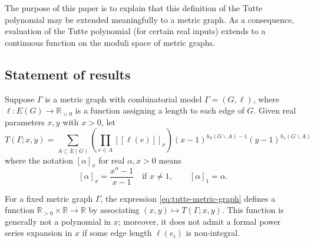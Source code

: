 \documentclass{amsart}
\theoremstyle{definition}
\newcommand{\RR}{\mathbb{R}}
\newcommand{\RRpos}{\RR_{>0}}
\newcommand{\fanalog}[2]{[\![#2]\!]_{#1}}
\newcommand{\analog}[2]{[#2]_{#1}}
\begin{document}
The purpose of this paper is to explain that this definition of the Tutte polynomial may be extended meaningfully to a metric graph.
As a consequence, evaluation of the Tutte polynomial (for certain real inputs) extends to a continuous function on the moduli space of metric graphs.

\subsection{Statement of results}
Suppose $\Gamma$ is a metric graph with combinatorial model $\Gamma = (G,\ell)$,
where $\ell : E(G) \to \RRpos$ is a function assigning a 
length to each edge of $G$.
Given real parameters $x,y$ with $x > 0$,
let 
\begin{equation}
\label{eq:tutte-metric-graph}
	T(\Gamma; x,y) = \sum_{A \subset E(G)} \left( \prod_{e \in A} \fanalog{x}{\ell(e)} \right)
	(x-1)^{h_0(G\backslash A) - 1}(y-1)^{h_1(G\backslash A)}
\end{equation}
where the notation $\analog{x}{\alpha}$ for real $\alpha, x > 0$ means
\begin{equation*}
\label{eq:q-analog-real}
	\analog{x}{\alpha} = \frac{x^\alpha - 1}{x-1}
	\quad\text{if } x \neq 1,
	\qquad 
	\analog{1}{\alpha} = \alpha.
\end{equation*}


For a fixed metric graph $\Gamma$,
the expression \eqref{eq:tutte-metric-graph} defines a function
$\RRpos\times \RR \to \RR$
by associating $(x,y) \mapsto T(\Gamma; x,y)$. 
This function is generally not a polynomial in $x$; %
moreover,  it does not admit a formal power series expansion in $x$ 
if some edge length $\ell(e_i)$ is non-integral.
\end{document}
